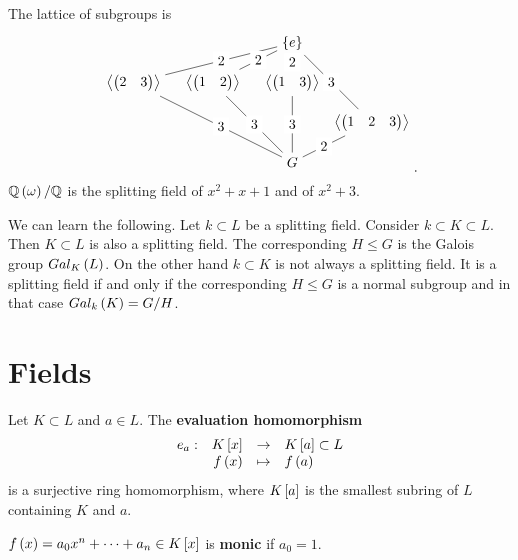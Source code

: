 \begin{example}
$$\begin{array}{rrl}
\end{array}
$$
The lattice of subgroups is
$$
\begin{tikzpicture}
\node (E) at (0, 3) {$ \cb{e} $};
\node (K1) at (-4, 2) {$ \ab{\onebytwo{2}{3}} $};
\node (K2) at (-2, 2) {$ \ab{\onebytwo{1}{2}} $};
\node (K3) at (0, 2) {$ \ab{\onebytwo{1}{3}} $};
\node (K) at (2, 1) {$ \ab{\onebythree{1}{2}{3}} $};
\node (G) at (0, 0) {$ G $};
\draw (E) -- node[fill=white]{2} (K1) -- node[fill=white]{3} (G);
\draw (E) -- node[fill=white]{2} (K2) -- node[fill=white]{3} (G);
\draw (E) -- node[fill=white]{2} (K3) -- node[fill=white]{3} (G);
\draw (E) -- node[fill=white]{3} (K) -- node[fill=white]{2} (G);
\end{tikzpicture}.
$$
$ \Q\rb{\omega} / \Q $ is the splitting field of $ x^2 + x + 1 $ and of $ x^2 + 3 $.
\end{example}

We can learn the following. Let $ k \subset L $ be a splitting field. Consider $ k \subset K \subset L $. Then $ K \subset L $ is also a splitting field. The corresponding $ H \le G $ is the Galois group $ Gal_K\rb{L} $. On the other hand $ k \subset K $ is not always a splitting field. It is a splitting field if and only if the corresponding $ H \le G $ is a normal subgroup and in that case $ Gal_k\rb{K} = G / H $.

\pagebreak

\section{Fields}


Let $ K \subset L $ and $ a \in L $. The \textbf{evaluation homomorphism}
$$ \function[e_a]{K\sb{x}}{K\sb{a} \subset L}{f\rb{x}}{f\rb{a}} $$
is a surjective ring homomorphism, where $ K\sb{a} $ is the smallest subring of $ L $ containing $ K $ and $ a $.

\begin{definition}
$ f\rb{x} = a_0x^n + \dots + a_n \in K\sb{x} $ is \textbf{monic} if $ a_0 = 1 $.
\end{definition}

